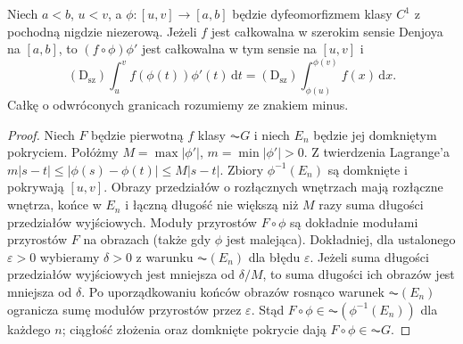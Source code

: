 \begin{twierdzenie}\label{ma1:kh:thm:wide-denjoy-substitution}
Niech $a<b$, $u<v$, a $\phi:[u,v]\to[a,b]$ będzie dyfeomorfizmem klasy $C^1$ z pochodną nigdzie niezerową. Jeżeli $f$ jest całkowalna w szerokim sensie Denjoya na $[a,b]$, to $(f\circ\phi)\phi'$ jest całkowalna w tym sensie na $[u,v]$ i
\[
 (\mathrm D_{\mathrm{sz}})\int_u^v f(\phi(t))\phi'(t)\,\mathrm dt
 =(\mathrm D_{\mathrm{sz}})\int_{\phi(u)}^{\phi(v)}f(x)\,\mathrm dx.
\]
Całkę o odwróconych granicach rozumiemy ze znakiem minus.
\end{twierdzenie}
\begin{proof}
Niech $F$ będzie pierwotną $f$ klasy $\AC G$ i niech $E_n$ będzie jej domkniętym pokryciem. Połóżmy $M=\max|\phi'|$, $m=\min|\phi'|>0$. Z twierdzenia Lagrange'a
$m|s-t|\le|\phi(s)-\phi(t)|\le M|s-t|$.
Zbiory $\phi^{-1}(E_n)$ są domknięte i pokrywają $[u,v]$. Obrazy przedziałów o rozłącznych wnętrzach mają rozłączne wnętrza, końce w $E_n$ i łączną długość nie większą niż $M$ razy suma długości przedziałów wyjściowych. Moduły przyrostów $F\circ\phi$ są dokładnie modułami przyrostów $F$ na obrazach (także gdy $\phi$ jest malejąca). Dokładniej, dla ustalonego $\varepsilon>0$ wybieramy
$\delta>0$ z warunku $\AC(E_n)$ dla błędu $\varepsilon$.
Jeżeli suma długości przedziałów wyjściowych jest
mniejsza od $\delta/M$, to suma długości ich obrazów
jest mniejsza od $\delta$. Po uporządkowaniu końców
obrazów rosnąco warunek $\AC(E_n)$ ogranicza sumę
modułów przyrostów przez $\varepsilon$.
Stąd $F\circ\phi\in\AC(\phi^{-1}(E_n))$ dla każdego $n$;
ciągłość złożenia oraz domknięte pokrycie dają
$F\circ\phi\in\AC G$.


\end{proof}
